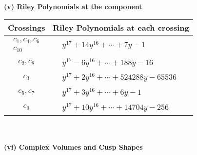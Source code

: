 \documentclass[1p]{elsarticle_modified}
\theoremstyle{definition}
\begin{document}
\flushleft \textbf{(v) Riley Polynomials at the component}\newline \\
\begin{tabular}{m{50pt}|m{274pt}}
Crossings & \hspace{64pt}Riley Polynomials at each crossing \\
\hline $$\begin{aligned}c_{1},c_{4},c_{6}\\c_{10}\end{aligned}$$&$\begin{aligned}
&y^{17}+14 y^{16}+\cdots+7 y-1
\end{aligned}$\\
\hline $$\begin{aligned}c_{2},c_{8}\end{aligned}$$&$\begin{aligned}
&y^{17}-6 y^{16}+\cdots+188 y-16
\end{aligned}$\\
\hline $$\begin{aligned}c_{3}\end{aligned}$$&$\begin{aligned}
&y^{17}+2 y^{16}+\cdots+524288 y-65536
\end{aligned}$\\
\hline $$\begin{aligned}c_{5},c_{7}\end{aligned}$$&$\begin{aligned}
&y^{17}+3 y^{16}+\cdots+6 y-1
\end{aligned}$\\
\hline $$\begin{aligned}c_{9}\end{aligned}$$&$\begin{aligned}
&y^{17}+10 y^{16}+\cdots+14704 y-256
\end{aligned}$\\
\hline
\end{tabular}\\~\\
\newpage\flushleft \textbf{(vi) Complex Volumes and Cusp Shapes}
\end{document}
